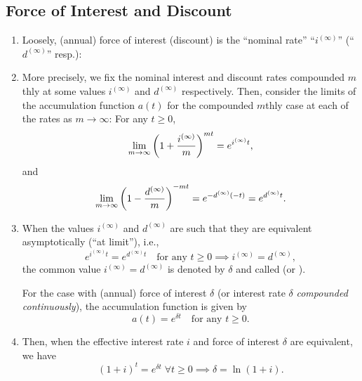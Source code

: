 \subsection{Force of Interest and Discount}
\begin{enumerate}
\item Loosely, (annual) force of interest (discount) is the ``nominal rate''
``\(i^{(\infty)}\)'' (``\(d^{(\infty)}\)'' resp.):
\begin{center}
\end{center}
\item More precisely, we fix the nominal interest and discount rates compounded
\(m\)thly at some values \(i^{(\infty)}\) and \(d^{(\infty)}\) respectively.
Then, consider the limits of the accumulation function \(a(t)\) for the
compounded \(m\)thly case at each of the rates as \(m\to\infty\): For any
\(t\ge 0\),
\[
\lim_{m\to \infty}\qty(1+\frac{i^{(\infty)}}{m})^{mt}=e^{i^{(\infty)}t},
\]
and
\[
\lim_{m\to \infty}\qty(1-\frac{d^{(\infty)}}{m})^{-mt}=e^{-d^{(\infty)}(-t)}
=e^{d^{(\infty)}t}.
\]

\item \label{it:foi-fod}
When the values \(i^{(\infty)}\) and \(d^{(\infty)}\) are such that they are
equivalent asymptotically (``at limit''), i.e.,
\[
e^{i^{(\infty)}t}=e^{d^{(\infty)}t}\quad\text{for any \(t\ge 0\)}\implies
i^{(\infty)}=d^{(\infty)},
\]
the common value \(i^{(\infty)}=d^{(\infty)}\) is denoted by \(\delta\) and
called  (or ).

For the  case with (annual) force of interest
\(\delta\) (or interest rate \(\delta\) \emph{compounded continuously}), the
accumulation function is given by
\[
a(t)=e^{\delta t}\quad\text{for any \(t\ge 0\)}.
\]
\item \label{it:foi-effective-equiv-fmla}
Then, when the effective interest rate \(i\) and force of interest \(\delta\)
are equivalent, we have
\[
(1+i)^t=e^{\delta t}\;\forall t\ge 0
\implies \boxed{\delta=\ln(1+i)}.
\]
\end{enumerate}
